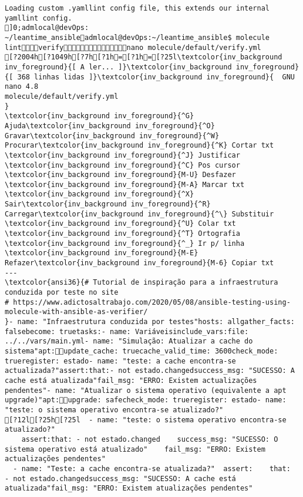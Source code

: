 \documentclass{scrartcl}
\begin{document}
\begin{Verbatim}
Loading custom .yamllint config file, this extends our internal yamllint config.
]0;admlocal@devOps: ~/leantime_ansibleadmlocal@devOps:~/leantime_ansible$ molecule lintverifynano molecule/default/verify.yml 
[?2004h[?1049h[?7h[?1h=[?1h=[?25l\textcolor{inv_background inv_foreground}{[ A ler... ]}\textcolor{inv_background inv_foreground}{[ 368 linhas lidas ]}\textcolor{inv_background inv_foreground}{  GNU nano 4.8                                          molecule/default/verify.yml                                                       }
\textcolor{inv_background inv_foreground}{^G} Ajuda\textcolor{inv_background inv_foreground}{^O} Gravar\textcolor{inv_background inv_foreground}{^W} Procurar\textcolor{inv_background inv_foreground}{^K} Cortar txt    \textcolor{inv_background inv_foreground}{^J} Justificar    \textcolor{inv_background inv_foreground}{^C} Pos cursor    \textcolor{inv_background inv_foreground}{M-U} Desfazer     \textcolor{inv_background inv_foreground}{M-A} Marcar txt
\textcolor{inv_background inv_foreground}{^X} Sair\textcolor{inv_background inv_foreground}{^R} Carregar\textcolor{inv_background inv_foreground}{^\} Substituir    \textcolor{inv_background inv_foreground}{^U} Colar txt     \textcolor{inv_background inv_foreground}{^T} Ortografia    \textcolor{inv_background inv_foreground}{^_} Ir p/ linha   \textcolor{inv_background inv_foreground}{M-E} Refazer\textcolor{inv_background inv_foreground}{M-6} Copiar txt
---
\textcolor{ansi36}{# Tutorial de inspiração para a infraestrutura conduzida por teste no site
# https://www.adictosaltrabajo.com/2020/05/08/ansible-testing-using-molecule-with-ansible-as-verifier/
}- name: "Infraestrutura conduzida por testes"hosts: allgather_facts: falsebecome: truetasks:- name: Variáveisinclude_vars:file: ../../vars/main.yml- name: "Simulação: Atualizar a cache do sistema"apt:update_cache: truecache_valid_time: 3600check_mode: trueregister: estado- name: "teste: a cache encontra-se actualizada?"assert:that:- not estado.changedsuccess_msg: "SUCESSO: A cache está atualizada"fail_msg: "ERRO: Existem actualizações pendentes"- name: "Atualizar o sistema operativo (equivalente a apt upgrade)"apt:upgrade: safecheck_mode: trueregister: estado- name: "teste: o sistema operativo encontra-se atualizado?"
[?12l[?25h[?25l  - name: "teste: o sistema operativo encontra-se atualizado?"
    assert:that: - not estado.changed    success_msg: "SUCESSO: O sistema operativo está atualizado"    fail_msg: "ERRO: Existem actualizações pendentes"
  - name: "Teste: a cache encontra-se atualizada?"  assert:    that:  - not estado.changedsuccess_msg: "SUCESSO: A cache está atualizada"fail_msg: "ERRO: Existem atualizações pendentes"

\end{Verbatim}
\end{document}
